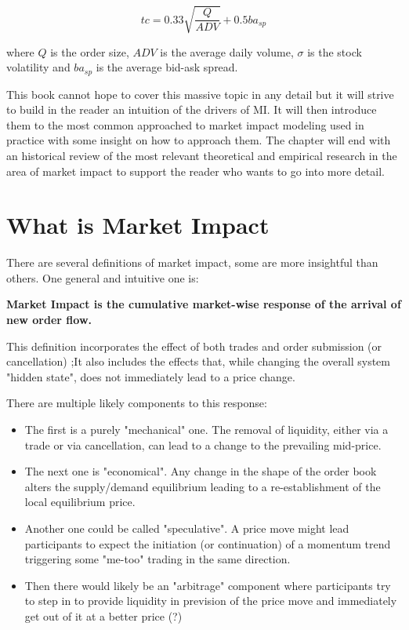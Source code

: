 \begin{equation}\label{eq:bb_tca}
		tc = 0.33\sqrt{\frac{Q}{ADV}} + 0.5 ba_{sp}
\end{equation}

where $Q$ is the order size, $ADV$ is the average daily volume, $\sigma$ is the stock volatility and $ba_{sp}$ is the average bid-ask spread. 

This book cannot hope to cover this massive topic in any detail but it will strive to build in the reader an intuition of the drivers of MI. It will then introduce them to the most common approached to market impact modeling used in practice with some insight on how to approach them. The chapter will end with an historical review of the most relevant theoretical and empirical research in the area of market impact to support the reader who wants to go into more detail.

\section{What is Market Impact}
There are several definitions of market impact, some are more insightful than others. One general and intuitive one is:
\begin{displayquote}
\textbf{Market Impact is the cumulative market-wise response of the arrival  of new order flow.}
\end{displayquote}

This definition incorporates the effect of both trades and order submission (or cancellation) ;It also includes the effects that, while changing the overall system "hidden state", does not immediately lead to a price change.

There are multiple likely components to this response:
\begin{itemize}
\item The first is a purely "mechanical" one. The removal of liquidity, either via a trade or via cancellation, can lead to a change to the prevailing mid-price.
\item The next one is "economical". Any change in the shape of the order book alters the supply/demand equilibrium leading to a re-establishment of the local equilibrium price. 
\item Another one could be called "speculative". A price move might lead participants to expect the initiation (or continuation) of a momentum trend triggering some "me-too" trading in the same direction.
\item Then there would likely be an "arbitrage" component where participants try to step in to provide liquidity in prevision of the price move and immediately get out of it at a better price (?)
\end{itemize} 

